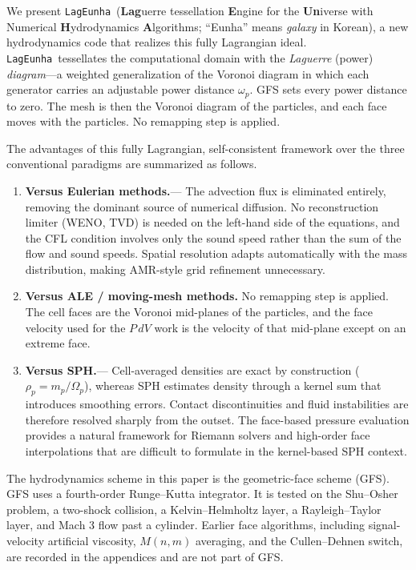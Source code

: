 \documentclass[twocolumn]{aastex63}
\newcommand{\lageunha}{\texttt{LagEunha}}
\begin{document}
We present \lageunha\ (\textbf{Lag}uerre tessellation
\textbf{E}ngine for the \textbf{Un}iverse with Numerical
\textbf{H}ydrodynamics \textbf{A}lgorithms; ``Eunha'' means
\emph{galaxy} in Korean), a new hydrodynamics code that
realizes this fully Lagrangian ideal.
\lageunha\ tessellates the computational domain with the
\emph{Laguerre} (power) \emph{diagram}---a weighted
generalization of the Voronoi diagram in which each generator
carries an adjustable power distance $\omega_p$.
GFS sets every power distance to zero.
The mesh is then the Voronoi diagram of the particles, and each face moves with the particles.
No remapping step is applied.

The advantages of this fully Lagrangian, self-consistent
framework over the three conventional paradigms are summarized
as follows.

\begin{enumerate}[leftmargin=*,itemsep=2pt]
\item \textbf{Versus Eulerian methods.}---
  The advection flux is eliminated entirely,
  removing the dominant source of numerical diffusion.
  No reconstruction limiter (WENO, TVD) is needed on the
  left-hand side of the equations, and the CFL condition
  involves only the sound speed rather than the sum of
  the flow and sound speeds.
  Spatial resolution adapts automatically with the mass
  distribution, making AMR-style grid refinement unnecessary.

\item \textbf{Versus ALE / moving-mesh methods.}
  No remapping step is applied.
  The cell faces are the Voronoi mid-planes of the particles, and the face velocity used for the $P\,dV$ work is the velocity of that mid-plane except on an extreme face.

\item \textbf{Versus SPH.}---
  Cell-averaged densities are exact by construction
  ($\rho_p = m_p/\Omega_p$), whereas SPH estimates density
  through a kernel sum that introduces smoothing errors.
  Contact discontinuities and fluid instabilities are
  therefore resolved sharply from the outset.
  The face-based pressure evaluation provides a natural
  framework for Riemann solvers and high-order face
  interpolations that are difficult to formulate in the
  kernel-based SPH context.
\end{enumerate}

The hydrodynamics scheme in this paper is the geometric-face scheme (GFS).
GFS uses a fourth-order Runge--Kutta integrator.
It is tested on the Shu--Osher problem, a two-shock collision, a Kelvin--Helmholtz layer, a Rayleigh--Taylor layer, and Mach 3 flow past a cylinder.
Earlier face algorithms, including signal-velocity artificial viscosity, $M(n,m)$ averaging, and the Cullen--Dehnen switch, are recorded in the appendices and are not part of GFS.
\end{document}
